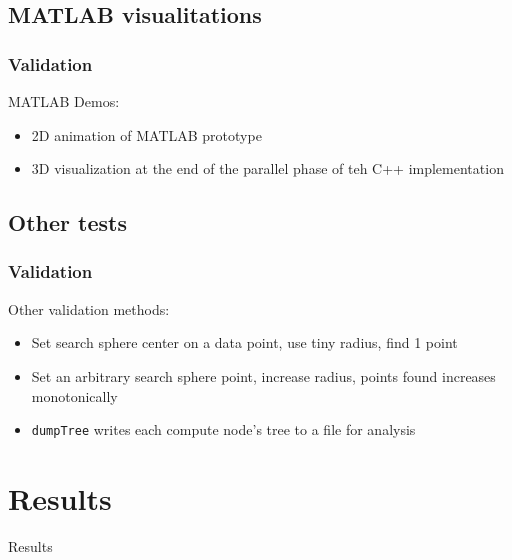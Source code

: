 \documentclass{beamer}
\begin{document}
\subsection{MATLAB visualitations}

\begin{frame}	
	\frametitle{Validation}
	
	\begin{block}{MATLAB Demos:}
		\begin{itemize}
			\item 2D animation of MATLAB prototype
			\item 3D visualization at the end of the parallel phase of teh C++ implementation
		\end{itemize}
	\end{block}
	
\end{frame}


\subsection{Other tests}

\begin{frame}	
	\frametitle{Validation}
	
	\begin{block}{Other validation methods:}
		\begin{itemize}
			\item Set search sphere center on a data point, use tiny radius, find 1 point
			\item Set an arbitrary search sphere point, increase radius, points found increases monotonically
			\item \texttt{dumpTree} writes each compute node's tree to a file for analysis
		\end{itemize}
	\end{block}
	
\end{frame}




\section{Results}

\begin{frame}	
	\begin{Huge}
		\begin{center}
			Results
		\end{center}
	\end{Huge}
\end{frame}
\end{document}
